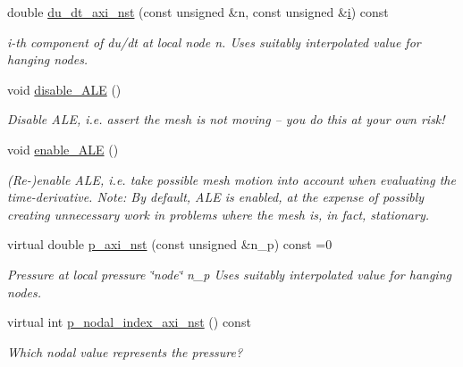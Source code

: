 \begin{DoxyCompactItemize}
double \hyperlink{classoomph_1_1GeneralisedNewtonianAxisymmetricNavierStokesEquations_a8663a3a510ac181c861b0f303b377e27}{du\+\_\+dt\+\_\+axi\+\_\+nst} (const unsigned \&n, const unsigned \&\hyperlink{cfortran_8h_adb50e893b86b3e55e751a42eab3cba82}{i}) const
\begin{DoxyCompactList}\small\item\em i-\/th component of du/dt at local node n. Uses suitably interpolated value for hanging nodes. \end{DoxyCompactList}\item 
void \hyperlink{classoomph_1_1GeneralisedNewtonianAxisymmetricNavierStokesEquations_af6cf9daf6162eda987c95fc6a75a43db}{disable\+\_\+\+A\+LE} ()
\begin{DoxyCompactList}\small\item\em Disable A\+LE, i.\+e. assert the mesh is not moving -- you do this at your own risk! \end{DoxyCompactList}\item 
void \hyperlink{classoomph_1_1GeneralisedNewtonianAxisymmetricNavierStokesEquations_a4c9db571735ff4411cb69f610d86cbf2}{enable\+\_\+\+A\+LE} ()
\begin{DoxyCompactList}\small\item\em (Re-\/)enable A\+LE, i.\+e. take possible mesh motion into account when evaluating the time-\/derivative. Note\+: By default, A\+LE is enabled, at the expense of possibly creating unnecessary work in problems where the mesh is, in fact, stationary. \end{DoxyCompactList}\item 
virtual double \hyperlink{classoomph_1_1GeneralisedNewtonianAxisymmetricNavierStokesEquations_ac0498239daebac18dd5edc754a8799f9}{p\+\_\+axi\+\_\+nst} (const unsigned \&n\+\_\+p) const =0
\begin{DoxyCompactList}\small\item\em Pressure at local pressure \char`\"{}node\char`\"{} n\+\_\+p Uses suitably interpolated value for hanging nodes. \end{DoxyCompactList}\item 
virtual int \hyperlink{classoomph_1_1GeneralisedNewtonianAxisymmetricNavierStokesEquations_aaaba5e4ead0e847c21fc7e871121400a}{p\+\_\+nodal\+\_\+index\+\_\+axi\+\_\+nst} () const
\begin{DoxyCompactList}\small\item\em Which nodal value represents the pressure? \end{DoxyCompactList}\item 

\end{DoxyCompactItemize}
